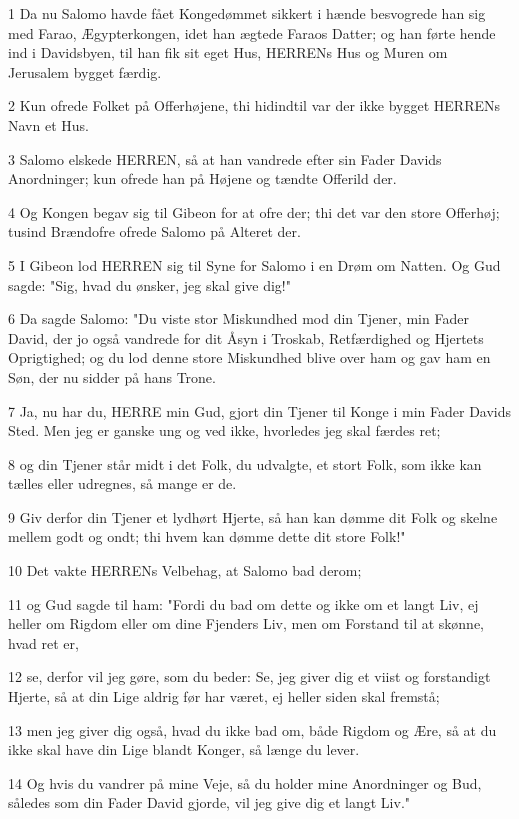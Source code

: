 \par 1 Da nu Salomo havde fået Kongedømmet sikkert i hænde besvogrede han sig med Farao, Ægypterkongen, idet han ægtede Faraos Datter; og han førte hende ind i Davidsbyen, til han fik sit eget Hus, HERRENs Hus og Muren om Jerusalem bygget færdig.
\par 2 Kun ofrede Folket på Offerhøjene, thi hidindtil var der ikke bygget HERRENs Navn et Hus.
\par 3 Salomo elskede HERREN, så at han vandrede efter sin Fader Davids Anordninger; kun ofrede han på Højene og tændte Offerild der.
\par 4 Og Kongen begav sig til Gibeon for at ofre der; thi det var den store Offerhøj; tusind Brændofre ofrede Salomo på Alteret der.
\par 5 I Gibeon lod HERREN sig til Syne for Salomo i en Drøm om Natten. Og Gud sagde: "Sig, hvad du ønsker, jeg skal give dig!"
\par 6 Da sagde Salomo: "Du viste stor Miskundhed mod din Tjener, min Fader David, der jo også vandrede for dit Åsyn i Troskab, Retfærdighed og Hjertets Oprigtighed; og du lod denne store Miskundhed blive over ham og gav ham en Søn, der nu sidder på hans Trone.
\par 7 Ja, nu har du, HERRE min Gud, gjort din Tjener til Konge i min Fader Davids Sted. Men jeg er ganske ung og ved ikke, hvorledes jeg skal færdes ret;
\par 8 og din Tjener står midt i det Folk, du udvalgte, et stort Folk, som ikke kan tælles eller udregnes, så mange er de.
\par 9 Giv derfor din Tjener et lydhørt Hjerte, så han kan dømme dit Folk og skelne mellem godt og ondt; thi hvem kan dømme dette dit store Folk!"
\par 10 Det vakte HERRENs Velbehag, at Salomo bad derom;
\par 11 og Gud sagde til ham: "Fordi du bad om dette og ikke om et langt Liv, ej heller om Rigdom eller om dine Fjenders Liv, men om Forstand til at skønne, hvad ret er,
\par 12 se, derfor vil jeg gøre, som du beder: Se, jeg giver dig et viist og forstandigt Hjerte, så at din Lige aldrig før har været, ej heller siden skal fremstå;
\par 13 men jeg giver dig også, hvad du ikke bad om, både Rigdom og Ære, så at du ikke skal have din Lige blandt Konger, så længe du lever.
\par 14 Og hvis du vandrer på mine Veje, så du holder mine Anordninger og Bud, således som din Fader David gjorde, vil jeg give dig et langt Liv."
